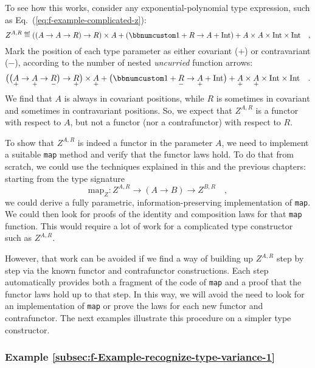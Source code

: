 To see how this works, consider any exponential-polynomial type expression,
such as Eq.~(\ref{eq:f-example-complicated-z}):
\[
Z^{A,R}\triangleq\left(\left(A\rightarrow A\rightarrow R\right)\rightarrow R\right)\times A+\left(\bbnum 1+R\rightarrow A+\text{Int}\right)+A\times A\times\text{Int}\times\text{Int}\quad,
\]
Mark the position of each type parameter as either covariant ($+$)
or contravariant ($-$), according to the number of nested \emph{uncurried}
function arrows:
\[
\big(\big(\underset{+}{A}\rightarrow\underset{+}{A}\rightarrow\underset{-}{R}\big)\rightarrow\underset{+}{R}\big)\times\underset{+}{A}+\big(\bbnum 1+\underset{-}{R}\rightarrow\underset{+}{A}+\text{Int}\big)+\underset{+}{A}\times\underset{+}{A}\times\text{Int}\times\text{Int}\quad.
\]
We find that $A$ is always in covariant positions, while $R$ is
sometimes in covariant and sometimes in contravariant positions. So,
we expect that $Z^{A,R}$ is a functor with respect to $A$, but not
a functor (nor a contrafunctor) with respect to $R$.

To show that $Z^{A,R}$ is indeed a functor in the parameter $A$,
we need to implement a suitable \lstinline!map! method and verify
that the functor laws hold. To do that from scratch, we could use
the techniques explained in this and the previous chapters: starting
from the type signature
\[
\text{map}_{Z}:Z^{A,R}\rightarrow\left(A\rightarrow B\right)\rightarrow Z^{B,R}\quad,
\]
we could derive a fully parametric, information-preserving implementation
of \lstinline!map!. We could then look for proofs of the identity
and composition laws for that \lstinline!map! function. This would
require a lot of work for a complicated type constructor such as $Z^{A,R}$.

However, that work can be avoided if we find a way of building up
$Z^{A,R}$ step by step via the known functor and contrafunctor constructions.
Each step automatically provides both a fragment of the code of \lstinline!map!
and a proof that the functor laws hold up to that step. In this way,
we will avoid the need to look for an implementation of \lstinline!map!
or prove the laws for each new functor and contrafunctor. The next
examples illustrate this procedure on a simpler type constructor.

\subsubsection{Example \label{subsec:f-Example-recognize-type-variance-1}\ref{subsec:f-Example-recognize-type-variance-1}}

